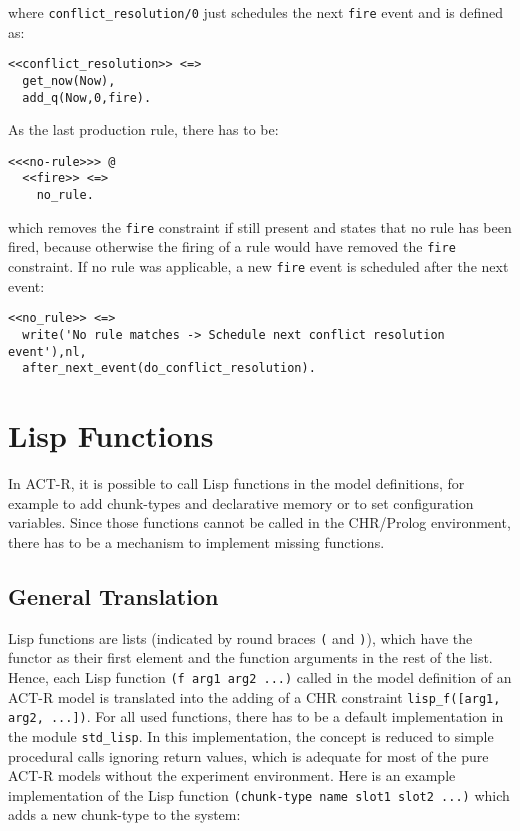 where \lstinline|conflict_resolution/0| just schedules the next \lstinline|fire| event and is defined as:

\begin{lstlisting}
<<conflict_resolution>> <=> 
  get_now(Now),
  add_q(Now,0,fire).
\end{lstlisting}

As the last production rule, there has to be:

\begin{lstlisting}
<<<no-rule>>> @ 
  <<fire>> <=> 
    no_rule.
\end{lstlisting}

which removes the \lstinline|fire| constraint if still present and states that no rule has been fired, because otherwise the firing of a rule would have removed the \lstinline|fire| constraint. If no rule was applicable, a new \lstinline|fire| event is scheduled after the next event:

\begin{lstlisting}
<<no_rule>> <=> 
  write('No rule matches -> Schedule next conflict resolution event'),nl,
  after_next_event(do_conflict_resolution).
\end{lstlisting}

\section{Lisp Functions}
\label{lisp_functions}

In ACT-R, it is possible to call Lisp functions in the model definitions, for example to add chunk-types and declarative memory or to set configuration variables. Since those functions cannot be called in the CHR/Prolog environment, there has to be a mechanism to implement missing functions.

\subsection{General Translation}

Lisp functions are lists (indicated by round braces \lstinline|(| and \lstinline|)|), which have the functor as their first element and the function arguments in the rest of the list. Hence, each Lisp function \lstinline|(f arg1 arg2 ...)| called in the model definition of an ACT-R model is translated into the adding of a CHR constraint \lstinline|lisp_f([arg1, arg2, ...])|. For all used functions, there has to be a default implementation in the module \lstinline|std_lisp|. In this implementation, the concept is reduced to simple procedural calls ignoring return values, which is adequate for most of the pure ACT-R models without the experiment environment. Here is an example implementation of the Lisp function \lstinline|(chunk-type name slot1 slot2 ...)| which adds a new chunk-type to the system:

